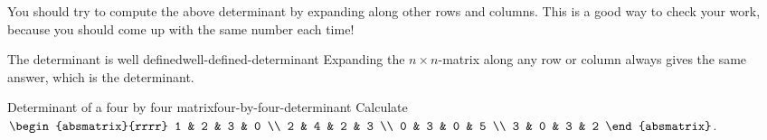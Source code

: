 You should try to compute the above determinant by expanding along
other rows and columns. This is a good way to check your work, because
you should come up with the same number each time!

\begin{theorem}{The determinant is well defined}{well-defined-determinant}
  Expanding the $n\times n$-matrix along any row or column always
  gives the same answer, which is the determinant.
\end{theorem}

\begin{example}{Determinant of a four by four matrix}{four-by-four-determinant}
  Calculate
  $\begin{absmatrix}{rrrr}
    1 & 2 & 3 & 0 \\
    2 & 4 & 2 & 3 \\
    0 & 3 & 0 & 5 \\
    3 & 0 & 3 & 2
  \end{absmatrix}$.
\end{example}

